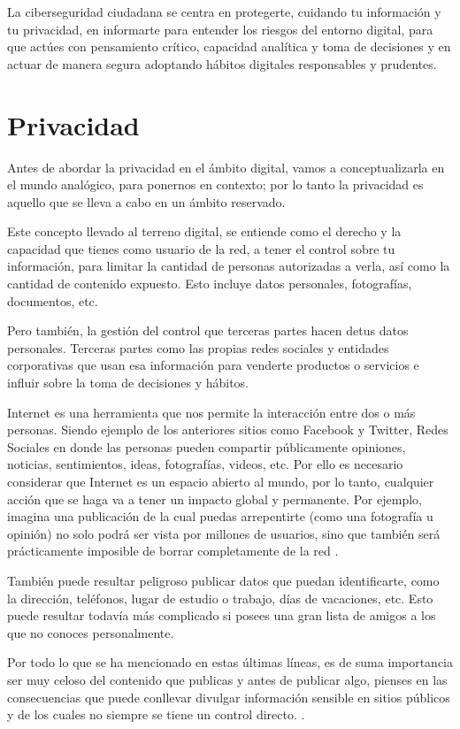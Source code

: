 \documentclass[
  spanish,
  a4paper,
  openany]{book}
\begin{document}
La ciberseguridad ciudadana se centra en protegerte, cuidando tu información y tu privacidad, en informarte para entender los riesgos del entorno digital, para que actúes con pensamiento crítico, capacidad analítica y toma de decisiones y en actuar de manera segura adoptando hábitos digitales responsables y prudentes.

\section{Privacidad}\label{privacidad}

Antes de abordar la privacidad en el ámbito digital, vamos a conceptualizarla en el mundo analógico, para ponernos en contexto; por lo tanto la privacidad es aquello que se lleva a cabo en un ámbito reservado.

Este concepto llevado al terreno digital, se entiende como el derecho y la capacidad que tienes como usuario de la red, a tener el control sobre tu información, para limitar la cantidad de personas autorizadas a verla, así como la cantidad de contenido expuesto. Esto incluye datos personales, fotografías, documentos, etc.

Pero también, la gestión del control que terceras partes hacen detus datos personales. Terceras partes como las propias redes sociales y entidades corporativas que usan esa información para venderte productos o servicios e influir sobre la toma de decisiones y hábitos.

Internet es una herramienta que nos permite la interacción entre dos o más personas. Siendo ejemplo de los anteriores sitios como Facebook y Twitter, Redes Sociales en donde las personas pueden compartir públicamente opiniones, noticias, sentimientos, ideas, fotografías, videos, etc. Por ello es necesario considerar que Internet es un espacio abierto al mundo, por lo tanto, cualquier acción que se haga va a tener un impacto global y permanente. Por ejemplo, imagina una publicación de la cual puedas arrepentirte (como una fotografía u opinión) no solo podrá ser vista por millones de usuarios, sino que también será prácticamente imposible de borrar completamente de la red .

También puede resultar peligroso publicar datos que puedan identificarte, como la dirección, teléfonos, lugar de estudio o trabajo, días de vacaciones, etc. Esto puede resultar todavía más complicado si posees una gran lista de amigos a los que no conoces personalmente.

Por todo lo que se ha mencionado en estas últimas líneas, es de suma importancia ser muy celoso del contenido que publicas y antes de publicar algo, pienses en las consecuencias que puede conllevar divulgar información sensible en sitios públicos y de los cuales no siempre se tiene un control directo. \citep{privacidad}.
\end{document}
